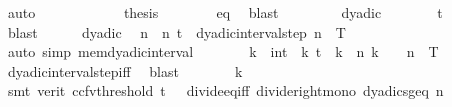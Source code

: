 \begin{isabellebody}
\ auto\isanewline
\ \ \ \ \isacommand{{\isacharbraceright}{\kern0pt}}\isamarkupfalse%
\isanewline
\ \ \ \ \isamarkupfalse%
\ \isamarkupfalse%
\ {\isacharquery}{\kern0pt}thesis\isanewline
\ \ \ \ \ \ \isamarkupfalse%
\ eq{\isacharunderscore}{\kern0pt}{}\ \isamarkupfalse%
\ blast\isanewline
\ \ \isamarkupfalse%
\isanewline
\ \ \ \ \isamarkupfalse%
\ dyadic\isanewline
\ \ \ \ \isamarkupfalse%
\ \isamarkupfalse%
\ {\isachardoublequoteopen}t\ {\isasymnoteq}\ {}{\isachardoublequoteclose}\isanewline
\ \ \ \ \ \ \isamarkupfalse%
\ blast\isanewline
\ \ \ \ \isamarkupfalse%
\ dyadic\ \isamarkupfalse%
\ n\ \ n{\isacharcolon}{\kern0pt}\ {\isachardoublequoteopen}t\ {\isasymin}\ dyadic{\isacharunderscore}{\kern0pt}interval{\isacharunderscore}{\kern0pt}step\ n\ {}\ T{\isachardoublequoteclose}\isanewline
\ \ \ \ \ \ \isamarkupfalse%
\ {\isacharparenleft}{\kern0pt}auto\ simp{\isacharcolon}{\kern0pt}\ mem{\isacharunderscore}{\kern0pt}dyadic{\isacharunderscore}{\kern0pt}interval{\isacharparenright}{\kern0pt}\isanewline
\ \ \ \ \isamarkupfalse%
\ \isamarkupfalse%
\ k\ {\isacharcolon}{\kern0pt}{\isacharcolon}{\kern0pt}\ int\ \ k{\isacharcolon}{\kern0pt}\ {\isachardoublequoteopen}t\ {\isacharequal}{\kern0pt}\ k\ {\isacharslash}{\kern0pt}\ {}{\isacharcircum}{\kern0pt}n{\isachardoublequoteclose}\ {\isachardoublequoteopen}k\ {\isasymle}\ {\isasymlfloor}{}\ {\isacharcircum}{\kern0pt}\ n\ {\isacharasterisk}{\kern0pt}\ T{\isasymrfloor}{\isachardoublequoteclose}\isanewline
\ \ \ \ \ \ \isamarkupfalse%
\ dyadic{\isacharunderscore}{\kern0pt}interval{\isacharunderscore}{\kern0pt}step{\isacharunderscore}{\kern0pt}iff\ \isamarkupfalse%
\ blast\isanewline
\ \ \ \ \isamarkupfalse%
\ \isamarkupfalse%
\ {\isachardoublequoteopen}k\ {\isachargreater}{\kern0pt}\ {}{\isachardoublequoteclose}\isanewline
\ \ \ \ \ \ \isamarkupfalse%
\ {\isacharparenleft}{\kern0pt}smt\ {\isacharparenleft}{\kern0pt}verit{\isacharcomma}{\kern0pt}\ ccfv{\isacharunderscore}{\kern0pt}threshold{\isacharparenright}{\kern0pt}\ {\isacartoucheopen}t\ {\isasymnoteq}\ {}{\isacartoucheclose}\ divide{\isacharunderscore}{\kern0pt}eq{\isacharunderscore}{\kern0pt}{}{\isacharunderscore}{\kern0pt}iff\ divide{\isacharunderscore}{\kern0pt}right{\isacharunderscore}{\kern0pt}mono\ dyadics{\isacharunderscore}{\kern0pt}geq\ n\isanewline

\end{isabellebody}
